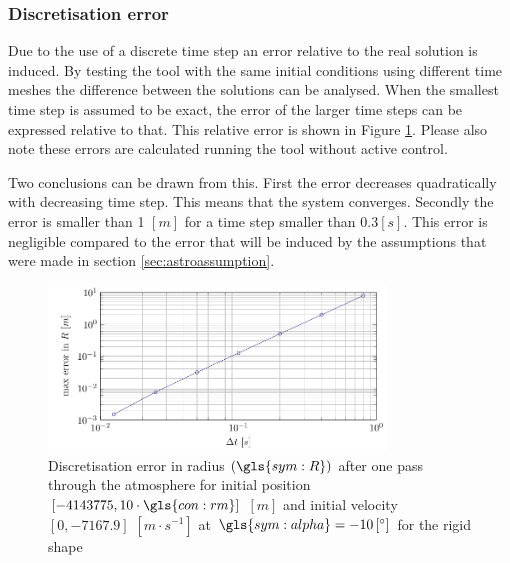 \subsubsection{Discretisation error}
\label{sec:astrodisc}

Due to the use of a discrete time step an error relative to the real solution is induced. By testing the tool with the same initial conditions using different time meshes the difference between the solutions can be analysed. When the smallest time step is assumed to be exact, the error of the larger time steps can be expressed relative to that. This relative error is shown in Figure \ref{fig:atmos_disc}. Please also note these errors are calculated running the tool without active control.

Two conclusions can be drawn from this. First the error decreases quadratically with decreasing time step. This means that the system converges. Secondly the error is smaller than 1 $\left[m\right]$ for a time step smaller than $0.3 \left[s\right]$. This error is negligible compared to the error that will be induced by the assumptions that were made in section \ref{sec:astroassumption}.



\begin{figure}[ht]
	\centering
	\includegraphics[width=0.8\textwidth]{Figure/orbit/dicretization.pdf}
	\caption[Discretisation error in radius $\left(\gls{sym:R}\right)$ after one pass through the atmosphere for the rigid shape]{Discretisation error in radius $\left(\gls{sym:R}\right)$ after one pass through the atmosphere for initial position $\left[-4143775,10\cdot\gls{con:rm}\right]$ $\left[m\right]$ and initial velocity $\left[0,-7167.9\right]$ $\left[m\cdot s^{-1} \right]$ at $\gls{sym:alpha}=-10\left[^\circ\right]$ for the rigid shape}
	\label{fig:atmos_disc}
\end{figure}

